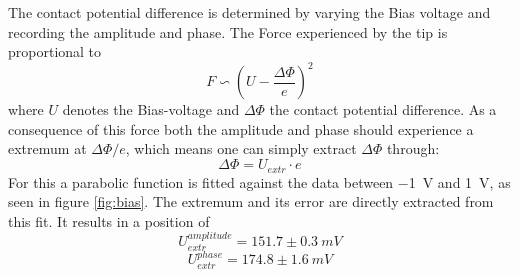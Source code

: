 \documentclass[%
 reprint,
amsmath,amssymb,
pra,
]{revtex4-1}
\begin{document}
The contact potential difference is determined by varying the Bias voltage and recording the amplitude and phase. The Force experienced by the tip is proportional to
\begin{equation}
F \backsim \left(U-\dfrac{\Delta\Phi}{e}\right)^2
\end{equation}
where $U$ denotes the Bias-voltage and $\Delta\Phi$ the contact potential difference. As a consequence of this force both the amplitude and phase should experience a extremum at $\Delta\Phi / e$, which means one can simply extract $\Delta\Phi$ through:
\begin{equation}
\Delta\Phi = U_{extr} \cdot e
\end{equation}
For this a parabolic function is fitted against the data between \SI{-1}{V} and \SI{1}{V}, as seen in figure \ref{fig:bias}. The extremum and its error are directly extracted from this fit. It results in a position of
\begin{equation}
U_{extr}^{amplitude} = 151.7 \pm \SI{0.3}{mV}
\end{equation}
\begin{equation}
U_{extr}^{phase} = 174.8 \pm \SI{1.6}{mV}
\end{equation}
\end{document}
